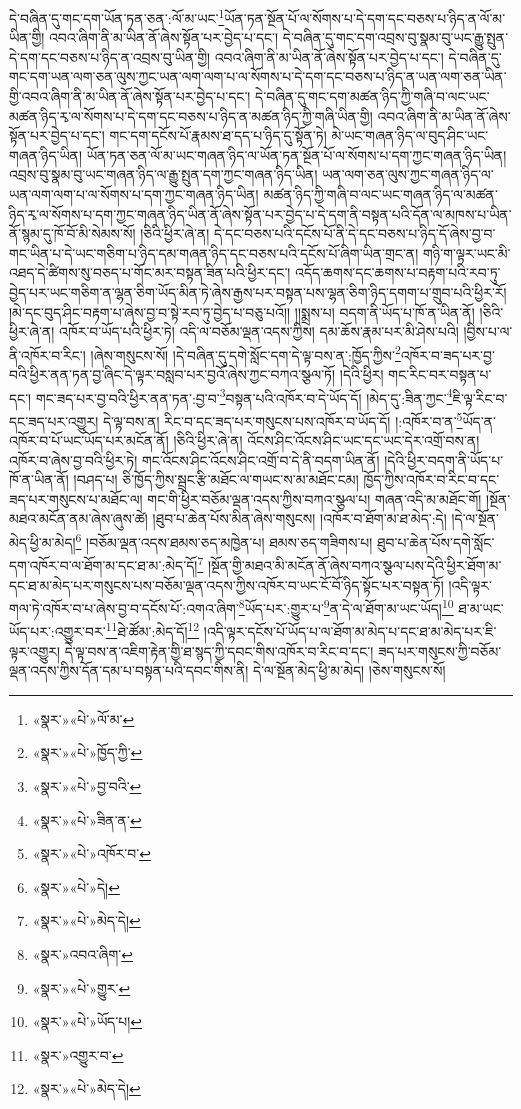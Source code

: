 དེ་བཞིན་དུ་གང་དག་ཡོན་ཏན་ཅན་:ལོ་མ་ཡང་\footnote{«སྣར་»«པེ་»ལོ་མ་}ཡོན་ཏན་སྔོན་པོ་ལ་སོགས་པ་དེ་དག་དང་བཅས་པ་ཉིད་ན་ལོ་མ་ཡིན་གྱི། འབའ་ཞིག་ནི་མ་ཡིན་ནོ་ཞེས་སྟོན་པར་བྱེད་པ་དང་། དེ་བཞིན་དུ་གང་དག་འབྲས་བུ་སྣམ་བུ་ཡང་རྒྱུ་སྤུན་དེ་དག་དང་བཅས་པ་ཉིད་ན་འབྲས་བུ་ཡིན་གྱི། འབའ་ཞིག་ནི་མ་ཡིན་ནོ་ཞེས་སྟོན་པར་བྱེད་པ་དང་། དེ་བཞིན་དུ་གང་དག་ཡན་ལག་ཅན་ལུས་ཀྱང་ཡན་ལག་ལག་པ་ལ་སོགས་པ་དེ་དག་དང་བཅས་པ་ཉིད་ན་ཡན་ལག་ཅན་ཡིན་གྱི་འབའ་ཞིག་ནི་མ་ཡིན་ནོ་ཞེས་སྟོན་པར་བྱེད་པ་དང་། དེ་བཞིན་དུ་གང་དག་མཚན་ཉིད་ཀྱི་གཞི་བ་ལང་ཡང་མཚན་ཉིད་རྭ་ལ་སོགས་པ་དེ་དག་དང་བཅས་པ་ཉིད་ན་མཚན་ཉིད་ཀྱི་གཞི་ཡིན་གྱི། འབའ་ཞིག་ནི་མ་ཡིན་ནོ་ཞེས་སྟོན་པར་བྱེད་པ་དང་། གང་དག་དངོས་པོ་རྣམས་ཐ་དད་པ་ཉིད་དུ་སྟོན་ཏེ། མེ་ཡང་གཞན་ཉིད་ལ་བུད་ཤིང་ཡང་གཞན་ཉིད་ཡིན། ཡོན་ཏན་ཅན་ལོ་མ་ཡང་གཞན་ཉིད་ལ་ཡོན་ཏན་སྔོན་པོ་ལ་སོགས་པ་དག་ཀྱང་གཞན་ཉིད་ཡིན། འབྲས་བུ་སྣམ་བུ་ཡང་གཞན་ཉིད་ལ་རྒྱུ་སྤུན་དག་ཀྱང་གཞན་ཉིད་ཡིན། ཡན་ལག་ཅན་ལུས་ཀྱང་གཞན་ཉིད་ལ་ཡན་ལག་ལག་པ་ལ་སོགས་པ་དག་ཀྱང་གཞན་ཉིད་ཡིན། མཚན་ཉིད་ཀྱི་གཞི་བ་ལང་ཡང་གཞན་ཉིད་ལ་མཚན་ཉིད་རྭ་ལ་སོགས་པ་དག་ཀྱང་གཞན་ཉིད་ཡིན་ནོ་ཞེས་སྟོན་པར་བྱེད་པ་དེ་དག་ནི་བསྟན་པའི་དོན་ལ་མཁས་པ་ཡིན་ནོ་སྙམ་དུ་ཁོ་བོ་མི་སེམས་སོ། །ཅིའི་ཕྱིར་ཞེ་ན། དེ་དང་བཅས་པའི་དངོས་པོ་ནི་དེ་དང་བཅས་པ་ཉིད་དོ་ཞེས་བྱ་བ་གང་ཡིན་པ་དེ་ཡང་གཅིག་པ་ཉིད་དམ་གཞན་ཉིད་དང་བཅས་པའི་དངོས་པོ་ཞིག་ཡིན་གྲང་ན། གཉི་ག་ལྟར་ཡང་མི་འཐད་དེ་ཚིགས་སུ་བཅད་པ་གོང་མར་བསྟན་ཟིན་པའི་ཕྱིར་དང་། འདོད་ཆགས་དང་ཆགས་པ་བརྟག་པའི་རབ་ཏུ་བྱེད་པར་ཡང་གཅིག་ན་ལྷན་ཅིག་ཡོད་མིན་ཏེ་ཞེས་རྒྱས་པར་བསྟན་པས་ལྷན་ཅིག་ཉིད་དགག་པ་གྲུབ་པའི་ཕྱིར་རོ། །མེ་དང་བུད་ཤིང་བརྟག་པ་ཞེས་བྱ་བ་སྟེ་རབ་ཏུ་བྱེད་པ་བཅུ་པའོ།། །།སྨྲས་པ། བདག་ནི་ཡོད་པ་ཁོ་ན་ཡིན་ནོ། །ཅིའི་ཕྱིར་ཞེ་ན། འཁོར་བ་ཡོད་པའི་ཕྱིར་ཏེ། འདི་ལ་བཅོམ་ལྡན་འདས་ཀྱིས། དམ་ཆོས་རྣམ་པར་མི་ཤེས་པའི། །བྱིས་པ་ལ་ནི་འཁོར་བ་རིང་། །ཞེས་གསུངས་སོ། །དེ་བཞིན་དུ་དགེ་སློང་དག་དེ་ལྟ་བས་ན་:ཁྱོད་ཀྱིས་\footnote{«སྣར་»«པེ་»ཁྱོད་ཀྱི་}འཁོར་བ་ཟད་པར་བྱ་བའི་ཕྱིར་ནན་ཏན་བྱ་ཞིང་དེ་ལྟར་བསླབ་པར་བྱའོ་ཞེས་ཀྱང་བཀའ་སྩལ་ཏོ། །དེའི་ཕྱིར། གང་རིང་བར་བསྟན་པ་དང་། གང་ཟད་པར་བྱ་བའི་ཕྱིར་ནན་ཏན་:བྱ་བ་\footnote{«སྣར་»«པེ་»བྱ་བའི་}བསྟན་པའི་འཁོར་བ་དེ་ཡོད་དོ། །མེད་དུ་:ཟིན་ཀྱང་\footnote{«སྣར་»«པེ་»ཟིན་ན་}ཇི་ལྟ་རིང་བ་དང་ཟད་པར་འགྱུར། དེ་ལྟ་བས་ན། རིང་བ་དང་ཟད་པར་གསུངས་པས་འཁོར་བ་ཡོད་དོ། །:འཁོར་བ་ན་\footnote{«སྣར་»«པེ་»འཁོར་བ་}ཡོད་ན་འཁོར་བ་པོ་ཡང་ཡོད་པར་མངོན་ནོ། །ཅིའི་ཕྱིར་ཞེ་ན། འོངས་ཤིང་འོངས་ཤིང་ཡང་དང་ཡང་དེར་འགྲོ་བས་ན། འཁོར་བ་ཞེས་བྱ་བའི་ཕྱིར་ཏེ། གང་འོངས་ཤིང་འོངས་ཤིང་འགྲོ་བ་དེ་ནི་བདག་ཡིན་ནོ། །དེའི་ཕྱིར་བདག་ནི་ཡོད་པ་ཁོ་ན་ཡིན་ནོ། །བཤད་པ། ཅི་ཁྱོད་ཀྱིས་སྦྲང་རྩི་མཐོང་ལ་གཡང་ས་མ་མཐོང་ངམ། ཁྱོད་ཀྱིས་འཁོར་བ་རིང་བ་དང་ཟད་པར་གསུངས་པ་མཐོང་ལ། གང་གི་ཕྱིར་བཅོམ་ལྡན་འདས་ཀྱིས་བཀའ་སྩལ་པ། གཞན་འདི་མ་མཐོང་གོ། །སྔོན་མཐའ་མངོན་ནམ་ཞེས་ཞུས་ཚེ། །ཐུབ་པ་ཆེན་པོས་མིན་ཞེས་གསུངས། །འཁོར་བ་ཐོག་མ་ཐ་མེད་:དེ། །དེ་ལ་སྔོན་མེད་ཕྱི་མ་མེད།\footnote{«སྣར་»«པེ་»དེ།} །བཅོམ་ལྡན་འདས་ཐམས་ཅད་མཁྱེན་པ། ཐམས་ཅད་གཟིགས་པ། ཐུབ་པ་ཆེན་པོས་དགེ་སློང་དག་འཁོར་བ་ལ་ཐོག་མ་དང་ཐ་མ་:མེད་དོ།\footnote{«སྣར་»«པེ་»མེད་དེ།} །སྔོན་གྱི་མཐའ་མི་མངོན་ནོ་ཞེས་བཀའ་སྩལ་པས་དེའི་ཕྱིར་ཐོག་མ་དང་ཐ་མ་མེད་པར་གསུངས་པས་བཅོམ་ལྡན་འདས་ཀྱིས་འཁོར་བ་ཡང་ངོ་བོ་ཉིད་སྟོང་པར་བསྟན་ཏོ། །འདི་ལྟར་གལ་ཏེ་འཁོར་བ་པ་ཞེས་བྱ་བ་དངོས་པོ་:འགའ་ཞིག་\footnote{«སྣར་»འབའ་ཞིག་}ཡོད་པར་:གྱུར་པ་\footnote{«སྣར་»«པེ་»གྱུར་}ན་དེ་ལ་ཐོག་མ་ཡང་ཡོད།\footnote{«སྣར་»«པེ་»ཡོད་པ།} ཐ་མ་ཡང་ཡོད་པར་:འགྱུར་བར་\footnote{«སྣར་»འགྱུར་བ་}ཐེ་ཚོམ་:མེད་དོ།\footnote{«སྣར་»«པེ་»མེད་དེ།} །འདི་ལྟར་དངོས་པོ་ཡོད་པ་ལ་ཐོག་མ་མེད་པ་དང་ཐ་མ་མེད་པར་ཇི་ལྟར་འགྱུར། དེ་ལྟ་བས་ན་འཇིག་རྟེན་གྱི་ཐ་སྙད་ཀྱི་དབང་གིས་འཁོར་བ་རིང་བ་དང་། ཟད་པར་གསུངས་ཀྱི་བཅོམ་ལྡན་འདས་ཀྱིས་དོན་དམ་པ་བསྟན་པའི་དབང་གིས་ནི། དེ་ལ་སྔོན་མེད་ཕྱི་མ་མེད། །ཅེས་གསུངས་སོ། 